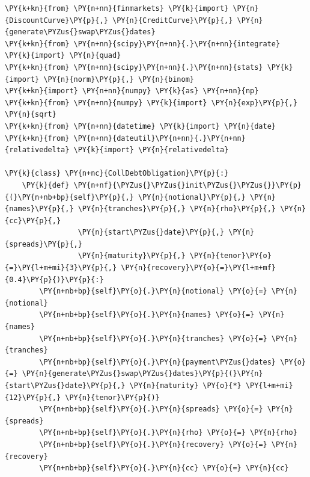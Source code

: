 \begin{tcolorbox}[breakable, size=fbox, boxrule=1pt, pad at break*=1mm,colback=cellbackground, colframe=cellborder]
\begin{Verbatim}[commandchars=\\\{\}]
\PY{k+kn}{from} \PY{n+nn}{finmarkets} \PY{k}{import} \PY{n}{DiscountCurve}\PY{p}{,} \PY{n}{CreditCurve}\PY{p}{,} \PY{n}{generate\PYZus{}swap\PYZus{}dates}
\PY{k+kn}{from} \PY{n+nn}{scipy}\PY{n+nn}{.}\PY{n+nn}{integrate} \PY{k}{import} \PY{n}{quad}
\PY{k+kn}{from} \PY{n+nn}{scipy}\PY{n+nn}{.}\PY{n+nn}{stats} \PY{k}{import} \PY{n}{norm}\PY{p}{,} \PY{n}{binom}
\PY{k+kn}{import} \PY{n+nn}{numpy} \PY{k}{as} \PY{n+nn}{np}
\PY{k+kn}{from} \PY{n+nn}{numpy} \PY{k}{import} \PY{n}{exp}\PY{p}{,} \PY{n}{sqrt}
\PY{k+kn}{from} \PY{n+nn}{datetime} \PY{k}{import} \PY{n}{date}
\PY{k+kn}{from} \PY{n+nn}{dateutil}\PY{n+nn}{.}\PY{n+nn}{relativedelta} \PY{k}{import} \PY{n}{relativedelta}
	
\PY{k}{class} \PY{n+nc}{CollDebtObligation}\PY{p}{:}
    \PY{k}{def} \PY{n+nf}{\PYZus{}\PYZus{}init\PYZus{}\PYZus{}}\PY{p}{(}\PY{n+nb+bp}{self}\PY{p}{,} \PY{n}{notional}\PY{p}{,} \PY{n}{names}\PY{p}{,} \PY{n}{tranches}\PY{p}{,} \PY{n}{rho}\PY{p}{,} \PY{n}{cc}\PY{p}{,}
                 \PY{n}{start\PYZus{}date}\PY{p}{,} \PY{n}{spreads}\PY{p}{,}
                 \PY{n}{maturity}\PY{p}{,} \PY{n}{tenor}\PY{o}{=}\PY{l+m+mi}{3}\PY{p}{,} \PY{n}{recovery}\PY{o}{=}\PY{l+m+mf}{0.4}\PY{p}{)}\PY{p}{:}
        \PY{n+nb+bp}{self}\PY{o}{.}\PY{n}{notional} \PY{o}{=} \PY{n}{notional}
        \PY{n+nb+bp}{self}\PY{o}{.}\PY{n}{names} \PY{o}{=} \PY{n}{names}
        \PY{n+nb+bp}{self}\PY{o}{.}\PY{n}{tranches} \PY{o}{=} \PY{n}{tranches}
        \PY{n+nb+bp}{self}\PY{o}{.}\PY{n}{payment\PYZus{}dates} \PY{o}{=} \PY{n}{generate\PYZus{}swap\PYZus{}dates}\PY{p}{(}\PY{n}{start\PYZus{}date}\PY{p}{,} \PY{n}{maturity} \PY{o}{*} \PY{l+m+mi}{12}\PY{p}{,} \PY{n}{tenor}\PY{p}{)}
        \PY{n+nb+bp}{self}\PY{o}{.}\PY{n}{spreads} \PY{o}{=} \PY{n}{spreads}
        \PY{n+nb+bp}{self}\PY{o}{.}\PY{n}{rho} \PY{o}{=} \PY{n}{rho}
        \PY{n+nb+bp}{self}\PY{o}{.}\PY{n}{recovery} \PY{o}{=} \PY{n}{recovery}
        \PY{n+nb+bp}{self}\PY{o}{.}\PY{n}{cc} \PY{o}{=} \PY{n}{cc}
	

\end{Verbatim}
\end{tcolorbox}
